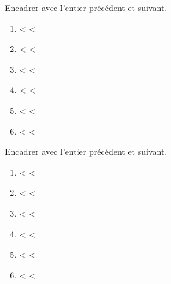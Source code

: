 \begin{exercice}
   Encadrer avec l'entier précédent et suivant. \medskip
   \begin{enumerate}
      \item \makebox[0.3\linewidth]{\dotfill} <  <   \makebox[0.3\linewidth]{\dotfill}\mbox{} \medskip
      \item \makebox[0.3\linewidth]{\dotfill} <  <   \makebox[0.3\linewidth]{\dotfill}\mbox{} \medskip
      \item \makebox[0.3\linewidth]{\dotfill} <  <   \makebox[0.3\linewidth]{\dotfill}\mbox{} \medskip
      \item \makebox[0.3\linewidth]{\dotfill} <  <   \makebox[0.3\linewidth]{\dotfill}\mbox{} \medskip
      \item \makebox[0.3\linewidth]{\dotfill} <  <   \makebox[0.3\linewidth]{\dotfill}\mbox{} \medskip
      \item \makebox[0.3\linewidth]{\dotfill} <  <   \makebox[0.3\linewidth]{\dotfill}\mbox{}
   \end{enumerate}
\end{exercice}
\begin{corrige}
   Encadrer avec l'entier précédent et suivant. \medskip
   \begin{enumerate}
      \item {}   <  <   \mbox{}
      \item {}  <  <   \mbox{}
      \item {}   <  <   \mbox{}
      \item {} <  <   \mbox{}
      \item {} <  <   \mbox{}
      \item {} <  <   \mbox{}
   \end{enumerate}
\end{corrige}
